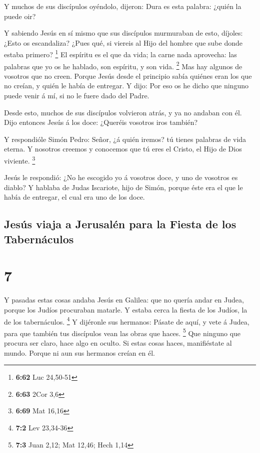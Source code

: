  Y muchos de sus discípulos oyéndolo, dijeron: Dura es
esta palabra: ¿quién la puede oir?

 Y sabiendo Jesús en sí mismo que sus discípulos
murmuraban de esto, díjoles: ¿Esto os escandaliza?  ¿Pues
qué, si viereis al Hijo del hombre que sube donde estaba primero?
\footnote{\textbf{6:62} Luc 24,50-51}  El espíritu es el
que da vida; la carne nada aprovecha: las palabras que yo os he hablado,
son espíritu, y son vida. \footnote{\textbf{6:63} 2Cor 3,6}
 Mas hay algunos de vosotros que no creen. Porque Jesús
desde el principio sabía quiénes eran los que no creían, y quién le
había de entregar.  Y dijo: Por eso os he dicho que
ninguno puede venir á mí, si no le fuere dado del Padre.

 Desde esto, muchos de sus discípulos volvieron atrás, y
ya no andaban con él.  Dijo entonces Jesús á los doce:
¿Queréis vosotros iros también?

 Y respondióle Simón Pedro: Señor, ¿á quién iremos? tú
tienes palabras de vida eterna.  Y nosotros creemos y
conocemos que tú eres el Cristo, el Hijo de Dios viviente. \footnote{\textbf{6:69}
  Mat 16,16}

 Jesús le respondió: ¿No he escogido yo á vosotros doce,
y uno de vosotros es diablo?  Y hablaba de Judas
Iscariote, hijo de Simón, porque éste era el que le había de entregar,
el cual era uno de los doce.

\hypertarget{jesuxfas-viaja-a-jerusaluxe9n-para-la-fiesta-de-los-tabernuxe1culos}{%
\subsection{Jesús viaja a Jerusalén para la Fiesta de los
Tabernáculos}\label{jesuxfas-viaja-a-jerusaluxe9n-para-la-fiesta-de-los-tabernuxe1culos}}

\hypertarget{section-6}{%
\section{7}\label{section-6}}

 Y pasadas estas cosas andaba Jesús en Galilea: que no
quería andar en Judea, porque los Judíos procuraban matarle.
 Y estaba cerca la fiesta de los Judíos, la de los
tabernáculos. \footnote{\textbf{7:2} Lev 23,34-36}  Y
dijéronle sus hermanos: Pásate de aquí, y vete á Judea, para que también
tus discípulos vean las obras que haces. \footnote{\textbf{7:3} Juan
  2,12; Mat 12,46; Hech 1,14}  Que ninguno que procura ser
claro, hace algo en oculto. Si estas cosas haces, manifiéstate al mundo.
 Porque ni aun sus hermanos creían en él.

